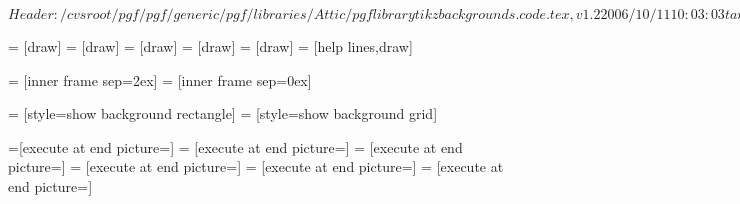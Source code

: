 \ProvidesFileRCS[v\pgfversion] $Header: /cvsroot/pgf/pgf/generic/pgf/libraries/Attic/pgflibrarytikzbackgrounds.code.tex,v 1.2 2006/10/11 10:03:03 tantau Exp $

%






= [draw]
=       [draw]
=    [draw]
=      [draw]
=     [draw]
=      [help lines,draw]

\def\tikz@framexsep{1ex}
\def\tikz@frameysep{1ex}

\def\tikz@outerframexsep{0ex}
\def\tikz@outerframeysep{0ex}



=     [inner frame sep=2ex]
=     [inner frame sep=0ex]




=                   [style=show background rectangle]
=                  [style=show background grid]

=[execute at end picture=\tikz@background@framed]
=      [execute at end picture=\tikz@background@top]
=   [execute at end picture=\tikz@background@bottom]
=     [execute at end picture=\tikz@background@left]
=    [execute at end picture=\tikz@background@right]
=     [execute at end picture=\tikz@background@grid]



